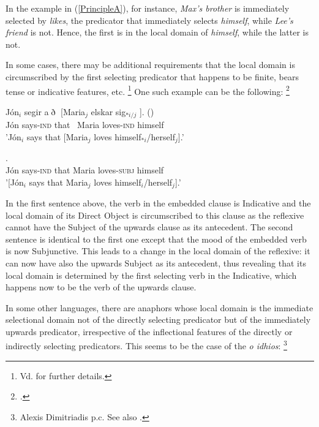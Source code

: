 \documentclass[output=paper
	        ,collection
	        ,collectionchapter
 	        ,biblatex
                ,babelshorthands
                ,newtxmath
                ,draftmode
                ,colorlinks, citecolor=brown
]{langscibook}
\begin{document}
In the example in (\ref{PrincipleA}), for instance, {\em Max's brother} is immediately 
selected by {\em likes}, the predicator that immediately selects {\em himself}, while {\em Lee's friend}
is not. Hence, the first is in the local domain of {\em himself}, while the latter is not.

In some cases, there may be additional requirements that the local domain
is circumscribed by the first selecting predicator that happens to be finite, 
bears tense or indicative features, etc.%
%
\footnote{
Vd. \citep{manziniWexler:parameters87, kosterReuland:longdistance91, dal:bind93} for further details.
}
One such example can be the following:%
%
\footnote{
\citep[]{manziniWexler:parameters87}.}


\begin{exe}
\ex
\begin{xlist}
\ex
\gll J\'{o}n$_{i}$ segir a$\eth$ [Maria$_{j}$ elskar sig$_{*i/j}$ ]. ()\\
J\'{o}n says-\textsc{ind} that \mbox{ }Maria loves-\textsc{ind} himself\\
\trans 'J\'{o}n$_{i}$ says that [Maria$_{j}$ loves himself$_{*i}$/herself$_{j}$].'

\ex
{}.\\
J\'{o}n says-\textsc{ind} that Maria loves-\textsc{subj} himself\\
\trans '[J\'{o}n$_{i}$ says that Maria$_{j}$ loves himself$_{i}$/herself$_{j}$].'
\end{xlist}
\end{exe}


In the first sentence above, the verb in the embedded clause is
Indicative and the local domain of its Direct Object is circumscribed
to this clause as the reflexive cannot have the Subject of the upwards
clause as its antecedent. The second sentence is identical to the first
one except that the mood of the embedded verb is now Subjunctive. This leads
to a change in the local domain of the reflexive: it can now have also the upwards
Subject as its antecedent, thus revealing that its local domain is determined
by the first selecting verb in the Indicative, which happens now to be the
verb of the upwards clause.


In some other languages, there are anaphors whose local domain
is the immediate selectional domain not of the directly selecting predicator
but of the immediately upwards predicator,  irrespective of the
inflectional features of the directly or indirectly selecting predicators. 
This seems to be the case of the  {\it o idhios}:%
%
\footnote{
Alexis Dimitriadis p.c. See also \citep{iatridou:86, varlokostaHornstein:93}. }
\end{document}
